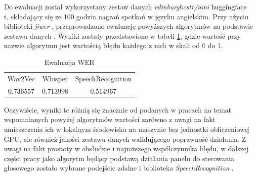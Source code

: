 Do ewaluacji został wykorzystany zestaw danych \textit{edinburghcstr/ami} huggingface t\cite{dataset-eval}, składający się ze 100 godzin nagrań spotkań w języku angielskim. Przy użyciu biblioteki \textit{jiwer} \cite{jiwer}, przeprowadzono ewaluację powyższych algorytmów na podstawie zestawu danych \cite{dataset-eval}. Wyniki zostały przedstawione w tabeli \ref{tab:tab1}, gdzie wartość przy nazwie algorytmu jest wartością błędu każdego z nich w skali od 0 do 1.
\begin{table}[h]
    \centering
    \caption{Ewaluacja WER}
    \begin{tabular}{c|c|c}
        Wav2Vec & Whisper & SpeechRecognition  \\ 
        0.736557 & 0.713998 & 0.514967
    \end{tabular}
    \label{tab:tab1}
\end{table}
Oczywiście, wyniki te różnią się znacznie od podanych w pracach na temat wspomnianych powyżej algorytmów wartości zarówno z uwagi na fakt umieszczenia ich w lokalnym środowisku na maszynie bez jednostki obliczeniowej GPU, ale również jakości zestawu danych walidującego poprawność działania. Z uwagi na fakt prostoty w obsłudzie i najniższego współczynnika błędu, w dalszej części pracy jako algorytm będący podstawą działania panelu do sterowania głosowego zostało wybrane podejście zdalne i biblioteka \textit{SpeechRecognition} \cite{speechrec}.